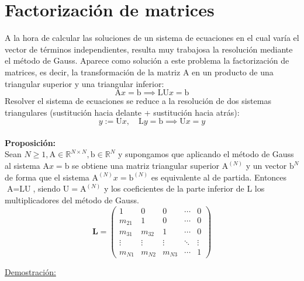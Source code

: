 \documentclass{article}
\begin{document}
\section{Factorización de matrices}
A la hora de calcular las soluciones de un sistema de ecuaciones en el cual varía el vector de términos independientes, resulta muy trabajosa la resolución mediante el método de Gauss. Aparece como solución a este problema la factorización de matrices, es decir, la transformación de la matriz A en un producto de una triangular superior y una triangular inferior:
$$\text{A}x=\text{b}\implies\text{LU}x=\text{b}$$
Resolver el sistema de ecuaciones se reduce a la resolución de dos sistemas triangulares (sustitución hacia delante + sustitución hacia atrás):
$$y:=\text{U}x,\quad\text{L}y=\text{b}\implies\text{U}x=y$$ 
\\
\textbf{Proposición:}
\\
Sean $N\geq 1,\text{A}\in\mathbb{R}^{N\times N}, \text{b}\in\mathbb{R}^N$ y supongamos que aplicando el método de Gauss al sistema A$x=\text{b}$ se obtiene una matriz triangular superior $\text{A}^{(N)}$ y un vector $\text{b}^{N}$ de forma que el sistema $\text{A}^{(N)}x=\text{b}^{(N)}$ es equivalente al de partida. Entonces $\text{A}=\text{LU}$, siendo $\text{U}=\text{A}^{(N)}$ y los coeficientes de la parte inferior de L los multiplicadores del método de Gauss.
$$\textbf{L}=\begin{pmatrix}
1 & 0 & 0 & \cdots & 0 \\
m_{21} & 1 & 0 & \cdots & 0 \\
m_{31} & m_{32} & 1 & \cdots & 0 \\
\vdots & \vdots & \vdots & \ddots & \vdots \\
m_{N1} & m_{N2} & m_{N3} & \cdots & 1
\end{pmatrix}$$

\hrulefill

\underline{Demostración:}
\end{document}
